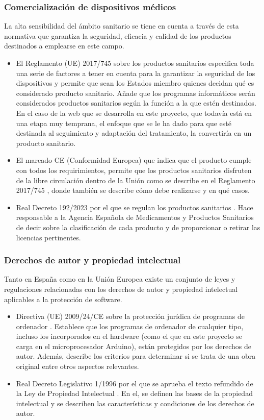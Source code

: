 \subsubsection{Comercialización de dispositivos médicos}
La alta sensibilidad del ámbito sanitario se tiene en cuenta a través de esta normativa que garantiza la seguridad, eficacia y calidad de los productos destinados a emplearse en este campo.
\begin{itemize}
    \item El Reglamento (UE) 2017/745 sobre los productos sanitarios \cite{BOE_2017/745:online} especifica toda una serie de factores a tener en cuenta para la garantizar la seguridad de los dispositivos y permite que sean los Estados miembro quienes decidan qué es considerado producto sanitario. Añade que los programas informáticos serán considerados productos sanitarios según la función a la que estén destinados. En el caso de la web que se desarrolla en este proyecto, que todavía está en una etapa muy temprana, el enfoque que se le ha dado para que esté destinada al seguimiento y adaptación del tratamiento, la convertiría en un producto sanitario.
    \item El marcado CE (Conformidad Europea) que indica que el producto cumple con todos los requirimientos, permite que los productos sanitarios disfruten de la libre circulación dentro de la Unión como se describe en el Reglamento 2017/745 \cite{BOE_2017/745:online}, donde también se describe cómo debe realizarse y en qué casos.
    \item Real Decreto 192/2023 por el que se regulan los productos sanitarios \cite{BOE_192/2023:online}. Hace responsable a la Agencia Española de Medicamentos y Productos Sanitarios de decir sobre la clasificación de cada producto y de proporcionar o retirar las licencias pertinentes.
\end{itemize}

\subsubsection{Derechos de autor y propiedad intelectual}
Tanto en España como en la Unión Europea existe un conjunto de leyes y regulaciones relacionadas con los derechos de autor y propiedad intelectual aplicables a la protección de software.
\begin{itemize}
    \item Directiva (UE) 2009/24/CE sobre la protección jurídica de programas de ordenador \cite{BOE_2009/24/CE:online}. Establece que los programas de ordenador de cualquier tipo, incluso los incorporados en el hardware (como el que en este proyecto se carga en el microprocesador Arduino), están protegidos por los derechos de autor. Además, describe los criterios para determinar si se trata de una obra original entre otros aspectos relevantes.
    \item Real Decreto Legislativo 1/1996 por el que se aprueba el texto refundido de la Ley de Propiedad Intelectual \cite{BOE_1/1996:online}. En el, se definen las bases de la propiedad intelectual y se describen las características y condiciones de los derechos de autor.
\end{itemize}

